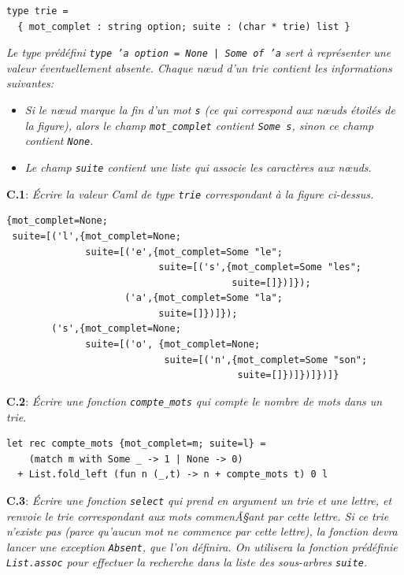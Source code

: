 \documentclass[11pt, a4paper]{article}
\begin{document}
\begin{verbatim}
type trie =
  { mot_complet : string option; suite : (char * trie) list }
\end{verbatim}

\emph{Le type prédéfini \texttt{type 'a option = None | Some of 'a}
sert à représenter une valeur éventuellement absente. Chaque nœud
d'un \emph{trie} contient les informations suivantes:}

\begin{itemize}
  \item \emph{Si le nœud marque la fin d'un mot {\tt s} (ce qui
        correspond aux nœuds étoilés de la figure), alors le champ
        {\tt mot\_complet} contient {\tt Some s}, sinon ce champ
        contient {\tt None}.}

  \item \emph{Le champ {\tt suite} contient une liste qui associe les
        caractères aux nœuds.}
\end{itemize}

\medskip

\noindent
\textbf{C.1}: \emph{Écrire la valeur Caml de type \texttt{trie}
correspondant à la figure ci-dessus.}

\smallskip

\begin{verbatim}
{mot_complet=None;
 suite=[('l',{mot_complet=None;
              suite=[('e',{mot_complet=Some "le";
                           suite=[('s',{mot_complet=Some "les";
                                        suite=[]})]});
                     ('a',{mot_complet=Some "la";
                           suite=[]})]});
        ('s',{mot_complet=None;
              suite=[('o', {mot_complet=None;
                            suite=[('n',{mot_complet=Some "son";
                                         suite=[]})]})]})]}
\end{verbatim}

\noindent
\textbf{C.2}: \emph{Écrire une fonction \texttt{compte\_mots} qui
compte le nombre de mots dans un \emph{trie}}.

\smallskip

\begin{verbatim}
let rec compte_mots {mot_complet=m; suite=l} =
    (match m with Some _ -> 1 | None -> 0)
  + List.fold_left (fun n (_,t) -> n + compte_mots t) 0 l
\end{verbatim}

\smallskip

\textbf{C.3}: \emph{Écrire une fonction \texttt{select} qui prend en
argument un \emph{trie} et une lettre, et renvoie le \emph{trie}
correspondant aux mots commenÃ§ant par cette lettre. Si ce \emph{trie}
n'existe pas (parce qu'aucun mot ne commence par cette lettre), la
fonction devra lancer une exception {\tt Absent}, que l'on
définira. On utilisera la fonction prédéfinie \texttt{List.assoc} pour
effectuer la recherche dans la liste des sous-arbres \texttt{suite}.}
\end{document}
